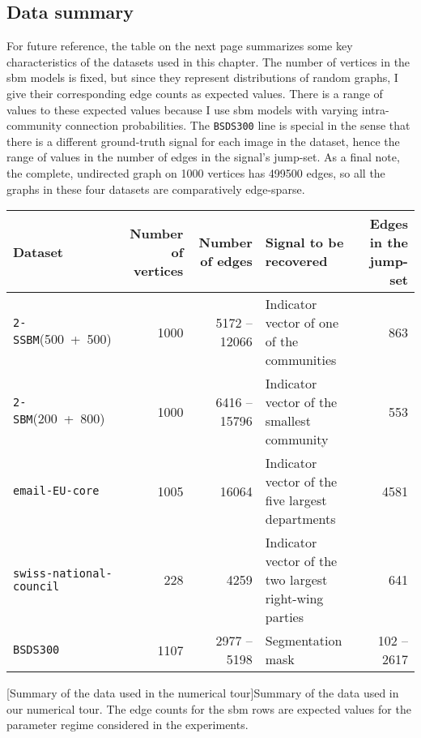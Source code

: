 \subsection{Data summary}

For future reference, the table on the next page summarizes some key characteristics of the datasets used in this chapter. The number of vertices in the \acrshort{sbm} models is fixed, but since they represent distributions of random graphs, I give their corresponding edge counts as expected values. There is a range of values to these expected values because I use \acrshort{sbm} models with varying intra-community connection probabilities. The \texttt{BSDS300} line is special in the sense that there is a different ground-truth signal for each image in the dataset, hence the range of values in the number of edges in the signal's jump-set. As a final note, the complete, undirected graph on 1000 vertices has 499500 edges, so all the graphs in these four datasets are comparatively edge-sparse.

\clearpage
\begin{landscape}
    \centering
    \captionsetup{type=table}
    \begin{tabularx}{\linewidth}{p{4.5cm} r r p{5.0cm} r}
        \hline
        Dataset & Number of vertices & Number of edges & Signal to be recovered & Edges in the jump-set \\
        \hline
        \texttt{2-SSBM}(500~+~500) & 1000 & 5172 -- 12066 & Indicator vector of one of the communities & 863 \\
        \texttt{2-SBM}(200~+~800) & 1000 & 6416 -- 15796 & Indicator vector of the smallest community & 553 \\
        \texttt{email-EU-core} & 1005 & 16064 & Indicator vector of the five largest departments & 4581 \\
        \texttt{swiss-national-council} & 228 & 4259 & Indicator vector of the two largest right-wing parties & 641 \\
        \texttt{BSDS300} & 1107 & 2977 -- 5198 & Segmentation mask & 102 -- 2617 \\
        \hline
    \end{tabularx}
    [Summary of the data used in the numerical tour]{Summary of the data used in our numerical tour. The edge counts for the \acrshort{sbm} rows are expected values for the parameter regime considered in the experiments.}
\end{landscape}
\clearpage

